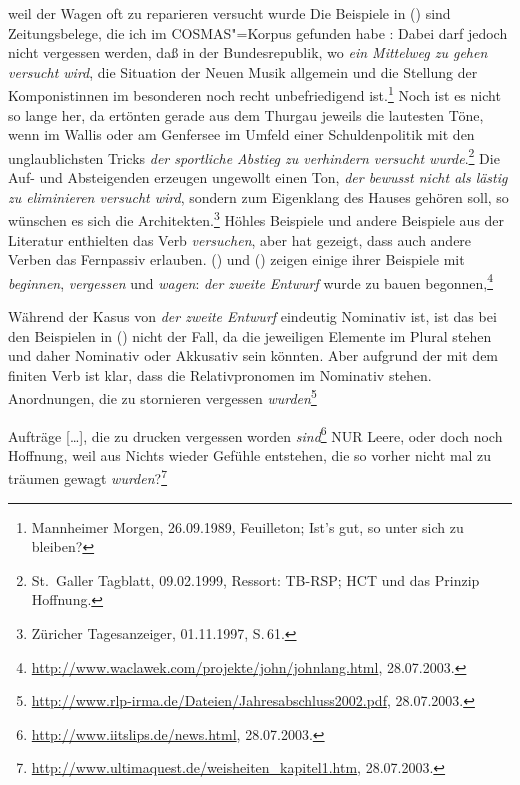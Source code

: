\ex 
weil    der        Wagen oft   zu reparieren versucht wurde
\label{bsp-zu-reparieren-versucht-wurde}
\zl
Die Beispiele in () sind Zeitungsbelege, die ich im COSMAS"=Korpus gefunden habe \citep[--137]{Mueller2002b}:
\eal
\ex Dabei darf jedoch nicht vergessen werden, daß in der Bundesrepublik, wo \emph{ein Mittelweg zu gehen versucht wird}, 
die Situation der Neuen Musik allgemein und die Stellung der Komponistinnen im besonderen noch recht unbefriedigend ist.\footnote{
Mannheimer Morgen, 26.09.1989, Feuilleton; Ist's gut, so unter sich zu bleiben?
}
\ex Noch ist es nicht so lange her, da ertönten gerade aus dem Thurgau jeweils die lautesten Töne, 
    wenn im Wallis oder am Genfersee im Umfeld einer Schuldenpolitik mit den unglaublichsten Tricks 
    \emph{der sportliche Abstieg zu verhindern versucht wurde}.\footnote{
St.\ Galler Tagblatt, 09.02.1999, Ressort: TB-RSP; HCT und das Prinzip Hoffnung.%
}
\ex Die Auf- und Absteigenden erzeugen ungewollt einen Ton, \emph{der bewusst nicht als lästig zu eliminieren versucht wird}, 
    sondern zum Eigenklang des Hauses gehören soll, so wünschen es sich die Architekten.\footnote{
Züricher Tagesanzeiger, 01.11.1997, S.\,61.%
}
\zl
Höhles Beispiele und andere Beispiele aus der Literatur enthielten das Verb \emph{versuchen},
aber \citet{Wurmbrand2003a} hat gezeigt, dass auch andere Verben das Fernpassiv erlauben. ()
und () zeigen einige ihrer Beispiele mit \emph{beginnen}, \emph{vergessen} und
\emph{wagen}:
\ea
\emph{der} \emph{zweite} \emph{Entwurf} wurde  zu bauen begonnen,\footnote{
\url{http://www.waclawek.com/projekte/john/johnlang.html}, 28.07.2003.
}

\z

\noindent
Während der Kasus von \emph{der zweite Entwurf} eindeutig Nominativ ist, ist das bei
den Beispielen in () nicht der Fall, da die jeweiligen Elemente im
Plural stehen und daher Nominativ oder Akkusativ sein könnten. Aber aufgrund der  mit dem finiten Verb ist
klar, dass die Relativpronomen im Nominativ stehen.
\eal
\ex 
Anordnungen, die zu stornieren vergessen \emph{wurden}\footnote{
        \url{http://www.rlp-irma.de/Dateien/Jahresabschluss2002.pdf}, 28.07.2003.
}

\ex Aufträge [\ldots], die zu drucken vergessen worden \emph{sind}\/\footnote{
        \url{http://www.iitslips.de/news.html}, 28.07.2003.
}
\ex NUR Leere, oder doch noch Hoffnung, weil aus Nichts wieder Gefühle entstehen,
die so vorher nicht mal zu träumen gewagt \emph{wurden}?\footnote{
        \url{http://www.ultimaquest.de/weisheiten_kapitel1.htm}, 28.07.2003.
}

